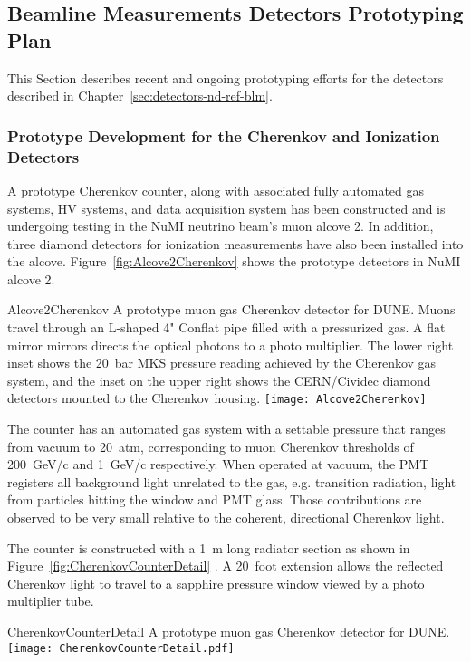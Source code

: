 \subsection{Beamline Measurements Detectors Prototyping Plan}
\label{sec:proto-nd-blm}
This Section describes recent and ongoing prototyping efforts for the detectors described in Chapter~\ref{sec:detectors-nd-ref-blm}.


\subsubsection{Prototype Development for the Cherenkov and Ionization Detectors}
\label{subsec:proto-blm-muon-cherenkov-proto}

A prototype Cherenkov counter, along with associated fully automated
gas systems, HV systems, and data acquisition system has been
constructed and is undergoing testing in the NuMI neutrino beam's muon
alcove 2. In addition, three diamond detectors\cite{ref:CERNdiamond}
for ionization measurements have also been installed into the alcove.
Figure~\ref{fig:Alcove2Cherenkov} shows the prototype detectors in
NuMI alcove 2.
\begin{cdrfigure}{Alcove2Cherenkov}
{A prototype muon gas Cherenkov detector for DUNE.
Muons travel through an L-shaped 4" Conflat pipe filled with a
pressurized gas. A flat mirror mirrors directs the optical photons
to a photo multiplier. The lower right inset shows the 20~bar MKS
pressure reading achieved by the Cherenkov gas system, and the inset
on the upper right shows the CERN/Cividec diamond detectors mounted to the Cherenkov housing.}
\texttt{[image: Alcove2Cherenkov]}
\end{cdrfigure}

The counter has an automated gas system with a settable pressure that
ranges from vacuum to 20~atm, corresponding to muon Cherenkov
thresholds of 200~GeV/c and 1~GeV/c respectively. When operated at
vacuum, the PMT registers all background light unrelated to the gas,
e.g. transition radiation, light from particles hitting the window and
PMT glass.  Those contributions are observed to be very small relative
to the coherent, directional Cherenkov light.

The counter is constructed with a 1~m long radiator section as shown
in Figure~\ref{fig:CherenkovCounterDetail} . A 20~foot extension
allows the reflected Cherenkov light to travel to a sapphire pressure
window viewed by a photo multiplier tube.
\begin{cdrfigure}{CherenkovCounterDetail}
{A prototype muon gas Cherenkov detector for DUNE.  }
\texttt{[image: CherenkovCounterDetail.pdf]}
\end{cdrfigure}


